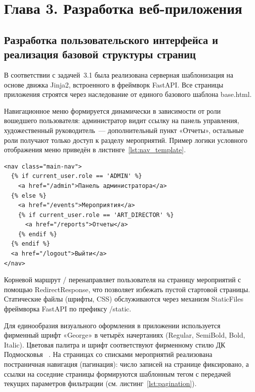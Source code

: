 
\section*{Глава 3. Разработка веб-приложения}

\subsection{Разработка пользовательского интерфейса и реализация базовой структуры страниц}

В соответствии с задачей~3.1 была реализована серверная шаблонизация на основе
движка Jinja2, встроенного в фреймворк FastAPI. Все страницы
приложения строятся через наследование от единого базового шаблона
base.html.

Навигационное меню формируется динамически в зависимости от роли вошедшего
пользователя: администратор видит ссылку на панель управления, художественный
руководитель~--- дополнительный пункт «Отчеты», остальные роли получают только
доступ к разделу мероприятий. Пример логики условного отображения меню
приведён в листинге~\ref{lst:nav_template}.

\begin{lstlisting}[caption={Фрагмент шаблона навигационного меню}, label={lst:nav_template}]
<nav class="main-nav">
  {% if current_user.role == 'ADMIN' %}
    <a href="/admin">Панель администратора</a>
  {% else %}
    <a href="/events">Мероприятия</a>
    {% if current_user.role == 'ART_DIRECTOR' %}
      <a href="/reports">Отчеты</a>
    {% endif %}
  {% endif %}
  <a href="/logout">Выйти</a>
</nav>
\end{lstlisting}

Корневой маршрут / перенаправляет пользователя на страницу
мероприятий с помощью RedirectResponse, что позволяет избежать
пустой стартовой страницы. Статические файлы (шрифты, CSS) обслуживаются
через механизм StaticFiles фреймворка FastAPI по префиксу /static.

Для единообразия визуального оформления в приложении используется
фирменный шрифт «George» в четырёх начертаниях (Regular, SemiBold, Bold,
Italic). Цветовая палитра и шрифт соответствуют фирменному стилю ДК Подмосковья ~\cite{brandbook}.
На страницах со списками мероприятий реализована постраничная навигация
(пагинация): число записей на странице фиксировано, а ссылки на соседние
страницы формируются шаблонным тегом с передачей текущих параметров
фильтрации (см. листинг~\ref{lst:pagination}).


